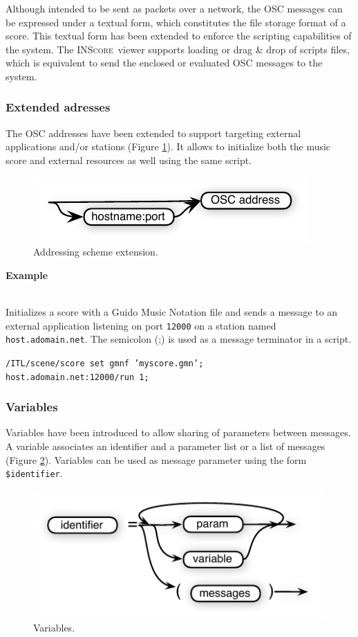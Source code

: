 \documentclass{article}
\newcommand{\inscore}		{\textsc{\small INScore}}
\newcommand{\code}[1]		{\texttt{\small #1}}
\newcounter{excount}
\newcommand{\exemple}			{\vspace{1mm} \hspace*{-4.5mm}\textbf{Example \arabic{excount}} \addtocounter{excount}{1}}
\newcommand{\sample}	[1]		{\begin{center}\colorbox{mygrey}{
								\begin{minipage}[t]{0.95\columnwidth} 
								{\small \texttt{#1}}
								\end{minipage}}\end{center}}
\begin{document}
Although intended to be sent as packets over a network, the OSC messages can be expressed under a textual form, which constitutes the file storage format of a score. This textual form has been extended to enforce the scripting capabilities of the system. The \inscore\ viewer supports loading or drag \& drop of scripts files, which is equivalent to send the enclosed or evaluated OSC messages to the system.

\subsubsection{Extended adresses}

The OSC addresses have been extended to support targeting external applications and/or stations (Figure \ref{fig:eaddr}). It allows to initialize both the music score and external resources as well using the same script.

\begin{figure}[htbp]
\centerline{
	\includegraphics[width=0.8\columnwidth]{imgs/extaddress}}
\caption{Addressing scheme extension.}
\label{fig:eaddr}
\end{figure}

\exemple \\
Initializes a score with a Guido Music Notation file\cite{hoos98} and sends a message to an external application listening on port \code{12000} on a station named \code{host.adomain.net}. The semicolon (;) is used as a message terminator in a script.
\vspace{-1mm}\sample{/ITL/scene/score set gmnf 'myscore.gmn'; \\
host.adomain.net:12000/run 1; }

\subsubsection{Variables}

Variables have been introduced to allow sharing of parameters between messages. A variable associates an identifier and a parameter list or a list of messages (Figure \ref{fig:var}). Variables can be used as message parameter using the form \code{\$identifier}.

\begin{figure}[htbp]
\centerline{
	\includegraphics[width=0.8\columnwidth]{imgs/variables}}
\caption{Variables.}
\label{fig:var}
\end{figure}
\end{document}
